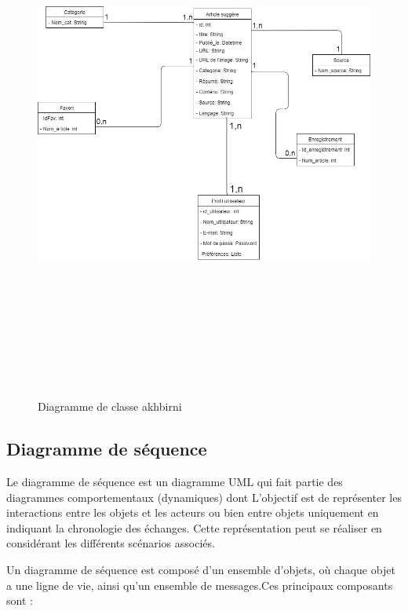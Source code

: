 \begin{figure}[H]
	\centering
	\includegraphics[height=500pt,width=400pt]{img/chapter3/ClassDiagram.jpg}
	\caption{Diagramme de classe akhbirni}
\end{figure}

\subsection{Diagramme de séquence}
Le diagramme de séquence est un diagramme UML qui fait partie des diagrammes comportementaux (dynamiques) dont L’objectif est de représenter les interactions entre les objets et les acteurs ou bien entre objets uniquement  en indiquant la chronologie des échanges. Cette représentation peut se réaliser en considérant les différents scénarios associés.

Un diagramme de séquence est composé d’un
ensemble d’objets, où chaque objet a une ligne de vie, ainsi qu’un ensemble de messages.Ces principaux composants sont :

